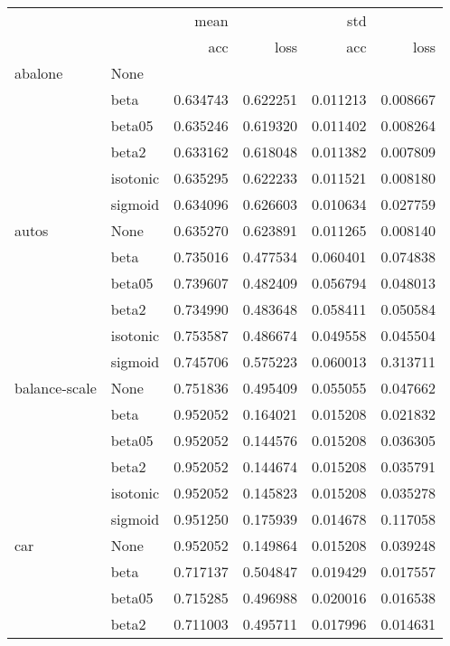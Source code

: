 \begin{tabular}{llrrrr}
\toprule
        &      &      mean &           &       std &           \\
        &      &       acc &      loss &       acc &      loss \\
\midrule
abalone & None &           &           &           &           \\
        & beta &  0.634743 &  0.622251 &  0.011213 &  0.008667 \\
        & beta05 &  0.635246 &  0.619320 &  0.011402 &  0.008264 \\
        & beta2 &  0.633162 &  0.618048 &  0.011382 &  0.007809 \\
        & isotonic &  0.635295 &  0.622233 &  0.011521 &  0.008180 \\
        & sigmoid &  0.634096 &  0.626603 &  0.010634 &  0.027759 \\
autos & None &  0.635270 &  0.623891 &  0.011265 &  0.008140 \\
        & beta &  0.735016 &  0.477534 &  0.060401 &  0.074838 \\
        & beta05 &  0.739607 &  0.482409 &  0.056794 &  0.048013 \\
        & beta2 &  0.734990 &  0.483648 &  0.058411 &  0.050584 \\
        & isotonic &  0.753587 &  0.486674 &  0.049558 &  0.045504 \\
        & sigmoid &  0.745706 &  0.575223 &  0.060013 &  0.313711 \\
balance-scale & None &  0.751836 &  0.495409 &  0.055055 &  0.047662 \\
        & beta &  0.952052 &  0.164021 &  0.015208 &  0.021832 \\
        & beta05 &  0.952052 &  0.144576 &  0.015208 &  0.036305 \\
        & beta2 &  0.952052 &  0.144674 &  0.015208 &  0.035791 \\
        & isotonic &  0.952052 &  0.145823 &  0.015208 &  0.035278 \\
        & sigmoid &  0.951250 &  0.175939 &  0.014678 &  0.117058 \\
car & None &  0.952052 &  0.149864 &  0.015208 &  0.039248 \\
        & beta &  0.717137 &  0.504847 &  0.019429 &  0.017557 \\
        & beta05 &  0.715285 &  0.496988 &  0.020016 &  0.016538 \\
        & beta2 &  0.711003 &  0.495711 &  0.017996 &  0.014631 \\

\end{tabular}
